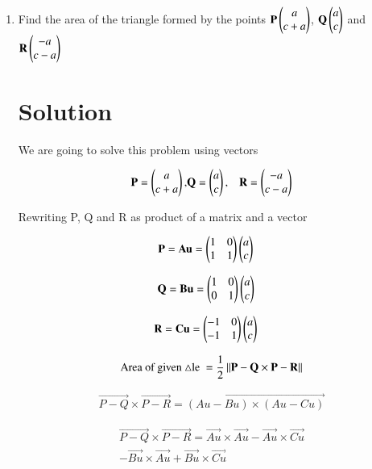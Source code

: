 \documentclass[journal,12pt,twocolumn]{IEEEtran}
\renewcommand\thesection{\arabic{section}}
\begin{document}
\begin{enumerate}[label=\thesection.\arabic*.,ref=\thesection.\theenumi]

\item Find the area of the triangle formed by the points $ \mathbf{P} \begin{pmatrix}a\\c+a\end{pmatrix}$, $\mathbf{Q} \begin{pmatrix}a\\c\end{pmatrix}$ and $\mathbf{R} \begin{pmatrix}-a\\c-a\end{pmatrix}$

\section{Solution}
We are going to solve this problem using vectors

\begin{align}
\mathbf{P}=\begin{pmatrix}a\\c+a\end{pmatrix},&\mathbf{Q} =\begin{pmatrix}a\\c\end{pmatrix},&\mathbf{R} =\begin{pmatrix}-a\\c-a\end{pmatrix}
\label{3}
\end{align}

Rewriting P, Q and R as product of a matrix and a vector

\begin{align}
\mathbf{P}=\mathbf{Au}=\begin{pmatrix}1&0\\1&1\end{pmatrix}\begin{pmatrix}a\\c\end{pmatrix}&&
\end{align}

\begin{align}
\mathbf{Q}=\mathbf{Bu}=\begin{pmatrix}1&0\\0&1\end{pmatrix}&\begin{pmatrix}a\\c\end{pmatrix}&
\end{align}

\begin{align}
\mathbf{R}=\mathbf{Cu}=\begin{pmatrix}-1&0\\-1&1\end{pmatrix}&\begin{pmatrix}a\\c\end{pmatrix}&
\end{align}

\begin{align}
\text{Area of given $\triangle$le }=\frac{1}{2}\norm{\Vec{P-Q}\times\Vec{P-R}}
\label{1}
\end{align}

\begin{align}
\Vec{P-Q}\times  \Vec{P-R} = \vec{(Au-Bu)\times(Au-Cu)}
\end{align}

\begin{multline}
\Vec{P-Q}\times  \Vec{P-R}=\vec{Au}\times\vec{Au}-\vec{Au}\times\vec{Cu}\\
-\vec{Bu}\times\vec{Au}+\vec{Bu}\times\vec{Cu}
\end{multline}


\end{enumerate}
\end{document}
